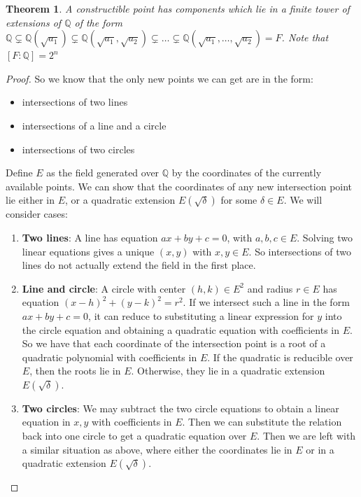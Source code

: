 \documentclass{article}
\theoremstyle{plain}
\newtheorem{thm}{Theorem}
\theoremstyle{definition}
\newcommand{\Q}{\mathbb{Q}}
\begin{document}
\begin{thm}
    A constructible point has components which lie in a finite tower of extensions of $\Q$ of the form $\Q \subsetneq \Q(\sqrt{a_1}) \subsetneq \Q(\sqrt{a_1}, \sqrt{a_2}) \subsetneq \dots \subsetneq \Q(\sqrt{a_1}, \dots, \sqrt{a_2}) = F$. Note that $[F: \Q] = 2^n$
\end{thm}
\begin{proof}
    So we know that the only new points we can get are in the form: \begin{itemize}
        \item intersections of two lines
        \item intersections of a line and a circle
        \item intersections of two circles
    \end{itemize}
    Define $E$ as the field generated over $\Q$ by the coordinates of the currently available points. We can show that the coordinates of any new intersection point lie either in $E$, or a quadratic extension $E(\sqrt{\delta})$ for some $\delta \in E$. We will consider cases:
    \begin{enumerate}
        \item \textbf{Two lines}: A line has equation $ax + by + c = 0$, with $a,b,c \in E$. Solving two linear equations gives a unique $(x,y)$ with $x,y \in E$. So intersections of two lines do not actually extend the field in the first place.
        \item \textbf{Line and circle}: A circle with center $(h,k) \in E^2$ and radius $r \in E$ has equation $(x-h)^2 + (y-k)^2 = r^2$. If we intersect such a line in the form $ax + by + c = 0$, it can reduce to substituting a linear expression for $y$ into the circle equation and obtaining a quadratic equation with coefficients in $E$. So we have that each coordinate of the intersection point is a root of a quadratic polynomial with coefficients in $E$. If the quadratic is reducible over $E$, then the roots lie in $E$. Otherwise, they lie in a quadratic extension $E(\sqrt{\delta})$.
        \item \textbf{Two circles}: We may subtract the two circle equations to obtain a linear equation in $x,y$ with coefficients in $E$. Then we can substitute the relation back into one circle to get a quadratic equation over $E$. Then we are left with a similar situation as above, where either the coordinates lie in $E$ or in a quadratic extension $E(\sqrt{\delta})$. 
    \end{enumerate}


\end{proof}
\end{document}
